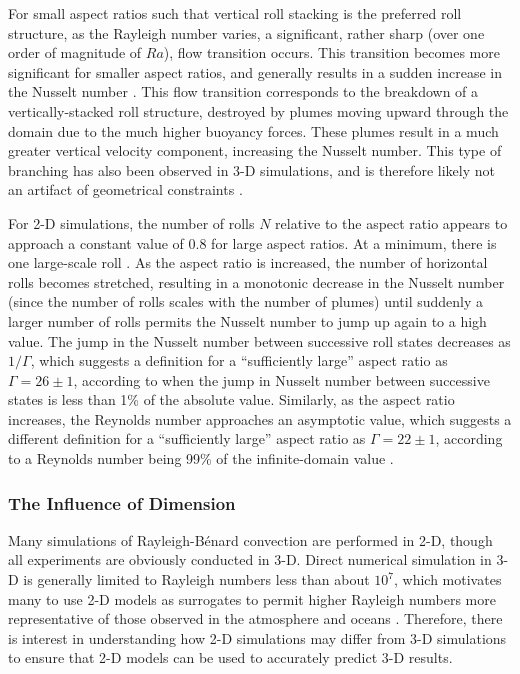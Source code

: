 \documentclass[10pt]{article}
\numberwithin{equation}{section} %
\begin{document}
For small aspect ratios such that vertical roll stacking is the preferred roll structure, as the Rayleigh number varies, a significant, rather sharp (over one order of magnitude of \(Ra\)), flow transition occurs. This transition becomes more significant for smaller aspect ratios, and generally results in a sudden increase in the Nusselt number \cite{poel}. This flow transition corresponds to the breakdown of a vertically-stacked roll structure, destroyed by plumes moving upward through the domain due to the much higher buoyancy forces. These plumes result in a much greater vertical velocity component, increasing the Nusselt number. This type of branching has also been observed in 3-D simulations, and is therefore likely not an artifact of geometrical constraints \cite{poel}.

For 2-D simulations, the number of rolls \(N\) relative to the aspect ratio appears to approach a constant value of 0.8 for large aspect ratios. At a minimum, there is one large-scale roll \cite{poel}. As the aspect ratio is increased, the number of horizontal rolls becomes stretched, resulting in a monotonic decrease in the Nusselt number (since the number of rolls scales with the number of plumes) until suddenly a larger number of rolls permits the Nusselt number to jump up again to a high value. The jump in the Nusselt number between successive roll states decreases as \(1/\Gamma\), which suggests a definition for a ``sufficiently large'' aspect ratio as \(\Gamma=26\pm1\), according to when the jump in Nusselt number between successive states is less than 1\% of the absolute value. Similarly, as the aspect ratio increases, the Reynolds number approaches an asymptotic value, which suggests a different definition for a ``sufficiently large'' aspect ratio as \(\Gamma=22\pm1\), according to a Reynolds number being 99\% of the infinite-domain value \cite{poel}.

\subsubsection{The Influence of Dimension}

Many simulations of Rayleigh-B\'enard convection are performed in 2-D, though all experiments are obviously conducted in 3-D.  Direct numerical simulation in 3-D is generally limited to Rayleigh numbers less than about \(10^7\), which motivates many to use 2-D models as surrogates to permit higher Rayleigh numbers more representative of those observed in the atmosphere and oceans \cite{schmalzl}. Therefore, there is interest in understanding how 2-D simulations may differ from 3-D simulations to ensure that 2-D models can be used to accurately predict 3-D results.
\end{document}
